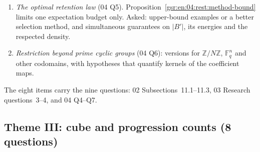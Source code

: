 \documentclass[11pt,letterpaper]{article}
\numberwithin{equation}{section}
\theoremstyle{definition}
\theoremstyle{remark}
\newcommand{\Z}{\mathbb Z}
\newcommand{\F}{\mathbb F}
\newcommand{\1}{\mathbf 1}
\begin{document}
\begin{enumerate}[label=\textbf{II.\arabic*},ref=II.\arabic*,leftmargin=2.6em]
\item\label{gsr:fz:q:II:retention} \emph{The optimal retention law} (04 Q5). Proposition~\ref{gsr:en:04:rest:method-bound} limits one expectation budget only. Asked: upper-bound examples or a better selection method, and simultaneous guarantees on $|B'|$, its energies and the respected density.
\item\label{gsr:fz:q:II:groups} \emph{Restriction beyond prime cyclic groups} (04 Q6): versions for $\Z/N\Z$, $\F_q^n$ and other codomains, with hypotheses that quantify kernels of the coefficient maps.
\end{enumerate}
The eight items carry the nine questions: 02 Subsections~11.1--11.3, 03 Research questions~3--4, and 04 Q4--Q7.

\subsection*{Theme III: cube and progression counts (8 questions)}
\end{document}
